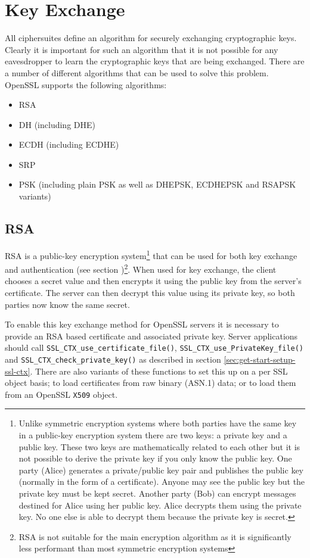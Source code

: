 \section{Key Exchange}

All ciphersuites define an algorithm for securely exchanging cryptographic
keys. Clearly it is important for such an algorithm that it is not possible for
any eavesdropper to learn the cryptographic keys that are being exchanged.
There are a number of different algorithms that can be used to solve this
problem. OpenSSL supports the following algorithms:
\begin{itemize}
\item RSA
\item DH (including DHE)
\item ECDH (including ECDHE)
\item SRP
\item PSK (including plain PSK as well as DHEPSK, ECDHEPSK and RSAPSK variants)
\end{itemize}

\subsection{RSA}

RSA is a public-key encryption system\footnote{Unlike symmetric encryption
systems where both parties have the same key in a public-key encryption system
there are two keys: a private key and a public key. These two keys are
mathematically related to each other but it is not possible to derive the
private key if you only know the public key. One party (Alice) generates a
private/public key pair and publishes the public key (normally in the form of a
certificate). Anyone may see the public key but the private key must be kept
secret. Another party (Bob) can encrypt messages destined for Alice using
her public key. Alice decrypts them using the private key. No one else is able
to decrypt them because the private key is secret.} that can be used for both
key exchange and authentication (see section )\footnote{RSA is
not suitable for the main encryption algorithm as it is significantly less
performant than most symmetric encryption systems}. When used for key exchange,
the client chooses a secret value and then encrypts it using the public key
from the server's certificate. The server can then decrypt this value using its
private key, so both parties now know the same secret.

To enable this key exchange method for OpenSSL servers it is necessary to
provide an RSA based certificate and associated private key. Server
applications should call \verb!SSL_CTX_use_certificate_file()!,
\verb!SSL_CTX_use_PrivateKey_file()! and \verb!SSL_CTX_check_private_key()! as
described in section \ref{sec:get-start-setup-ssl-ctx}. There are also variants
of these functions to set this up on a per SSL object basis; to load
certificates from raw binary (ASN.1) data; or to load them from an OpenSSL
\verb!X509! object.

